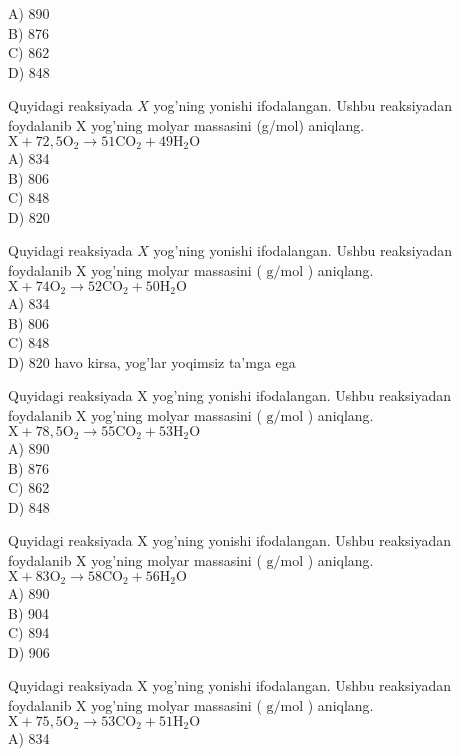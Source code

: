 A) 890\\
B) 876\\
C) 862\\
D) 848
  \item Quyidagi reaksiyada $X$ yog'ning yonishi ifodalangan. Ushbu reaksiyadan foydalanib X yog'ning molyar massasini (g/mol) aniqlang.\\
$\mathrm{X}+72,5 \mathrm{O}_{2} \rightarrow 51 \mathrm{CO}_{2}+49 \mathrm{H}_{2} \mathrm{O}$\\
A) 834\\
B) 806\\
C) 848\\
D) 820
  \item Quyidagi reaksiyada $X$ yog'ning yonishi ifodalangan. Ushbu reaksiyadan foydalanib X yog'ning molyar massasini ( $\mathrm{g} / \mathrm{mol}$ ) aniqlang. $\mathrm{X}+74 \mathrm{O}_{2} \rightarrow 52 \mathrm{CO}_{2}+50 \mathrm{H}_{2} \mathrm{O}$\\
A) 834\\
B) 806\\
C) 848\\
D) 820 havo kirsa, yog'lar yoqimsiz ta'mga ega
  \item Quyidagi reaksiyada X yog'ning yonishi ifodalangan. Ushbu reaksiyadan foydalanib X yog'ning molyar massasini ( $\mathrm{g} / \mathrm{mol}$ ) aniqlang.\\
$\mathrm{X}+78,5 \mathrm{O}_{2} \rightarrow 55 \mathrm{CO}_{2}+53 \mathrm{H}_{2} \mathrm{O}$\\
A) 890\\
B) 876\\
C) 862\\
D) 848
  \item Quyidagi reaksiyada X yog'ning yonishi ifodalangan. Ushbu reaksiyadan foydalanib X yog'ning molyar massasini ( $\mathrm{g} / \mathrm{mol}$ ) aniqlang. $\mathrm{X}+83 \mathrm{O}_{2} \rightarrow 58 \mathrm{CO}_{2}+56 \mathrm{H}_{2} \mathrm{O}$\\
A) 890\\
B) 904\\
C) 894\\
D) 906
  \item Quyidagi reaksiyada X yog'ning yonishi ifodalangan. Ushbu reaksiyadan foydalanib X yog'ning molyar massasini ( $\mathrm{g} / \mathrm{mol}$ ) aniqlang.\\
$\mathrm{X}+75,5 \mathrm{O}_{2} \rightarrow 53 \mathrm{CO}_{2}+51 \mathrm{H}_{2} \mathrm{O}$\\
A) 834\\
